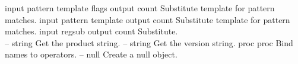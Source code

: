 \begin{longtable}{}
	{input pattern template flags}
	{{\bf {}}}
	{output count}
	{Substitute template for pattern matches.}
\optableent
	{input pattern template}
	{{\bf {}}}
	{output count}
	{Substitute template for pattern matches.}
\optableent
	{input regsub}
	{{\bf {}}}
	{output count}
	{Substitute.}
\hline \hline
{} \\
\hline \hline
\optableent
	{--}
	{{\bf {}}}
	{string}
	{Get the product string.}
\hline
\optableent
	{--}
	{{\bf {}}}
	{string}
	{Get the version string.}
\hline
\optableent
	{proc}
	{{\bf {}}}
	{proc}
	{Bind names to operators.}
\hline
\optableent
	{--}
	{{\bf {}}}
	{null}
	{Create a null object.}
\end{longtable}



